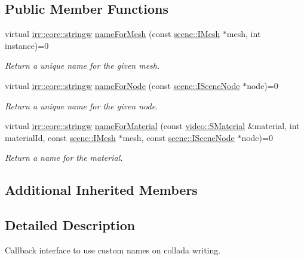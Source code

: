 \subsection*{Public Member Functions}
\begin{DoxyCompactItemize}
\item 
virtual \hyperlink{namespaceirr_1_1core_aef83fafbb1b36fcce44c07c9be23a7f2}{irr\+::core\+::stringw} \hyperlink{classirr_1_1scene_1_1IColladaMeshWriterNames_a2d36f1dee5904b3c622363282761ed0d}{name\+For\+Mesh} (const \hyperlink{classirr_1_1scene_1_1IMesh}{scene\+::\+I\+Mesh} $\ast$mesh, int instance)=0
\begin{DoxyCompactList}\small\item\em Return a unique name for the given mesh. \end{DoxyCompactList}\item 
virtual \hyperlink{namespaceirr_1_1core_aef83fafbb1b36fcce44c07c9be23a7f2}{irr\+::core\+::stringw} \hyperlink{classirr_1_1scene_1_1IColladaMeshWriterNames_a60d3fdad90edc25b0305c91be15b255f}{name\+For\+Node} (const \hyperlink{classirr_1_1scene_1_1ISceneNode}{scene\+::\+I\+Scene\+Node} $\ast$node)=0
\begin{DoxyCompactList}\small\item\em Return a unique name for the given node. \end{DoxyCompactList}\item 
virtual \hyperlink{namespaceirr_1_1core_aef83fafbb1b36fcce44c07c9be23a7f2}{irr\+::core\+::stringw} \hyperlink{classirr_1_1scene_1_1IColladaMeshWriterNames_acb5c8f38769d3fedcc76df73d9350c07}{name\+For\+Material} (const \hyperlink{classirr_1_1video_1_1SMaterial}{video\+::\+S\+Material} \&material, int material\+Id, const \hyperlink{classirr_1_1scene_1_1IMesh}{scene\+::\+I\+Mesh} $\ast$mesh, const \hyperlink{classirr_1_1scene_1_1ISceneNode}{scene\+::\+I\+Scene\+Node} $\ast$node)=0
\begin{DoxyCompactList}\small\item\em Return a name for the material. \end{DoxyCompactList}\end{DoxyCompactItemize}
\subsection*{Additional Inherited Members}


\subsection{Detailed Description}
Callback interface to use custom names on collada writing. 


